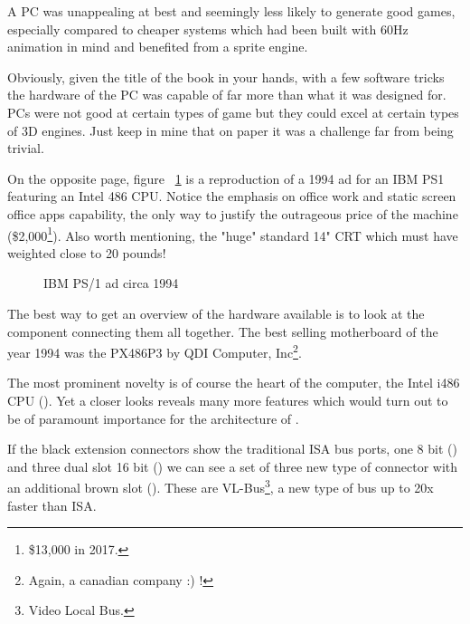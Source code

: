 \par
 A PC was unappealing at best and seemingly less likely to generate good games, especially compared to cheaper systems which had been built with 60Hz animation in mind and benefited from a sprite engine.\\
 \par
  Obviously, given the title of the book in your hands, with a few software tricks the hardware of the PC was capable of far more than what it was designed for. PCs were not good at certain types of game but they could excel at certain types of 3D engines. Just keep in mine that on paper it was a challenge far from being trivial.\\
\par

On the opposite page, figure ~\ref{ibm_ps1_top} is a reproduction of a 1994 ad for an IBM PS1 featuring an Intel 486 CPU. Notice the emphasis on office work and static screen office apps capability, the only way to justify the outrageous price of the machine (\$2,000\footnote{\$13,000 in 2017.}). Also worth mentioning, the "huge" standard 14" CRT which must have weighted close to 20 pounds!\\
\par
\begin{figure}[H] \centering
{}
\caption{IBM PS/1 ad circa 1994}
\label{ibm_ps1_top}
\end{figure}


















\cleartoleftpage
 
The best way to get an overview of the hardware available is to look at the component connecting them all together. The best selling motherboard of the year 1994 was the PX486P3 by QDI Computer, Inc\footnote{Again, a canadian company :) !}.\\

\par
The most prominent novelty is of course the heart of the computer, the Intel i486 CPU (). Yet a closer looks reveals many more features which would turn out to be of paramount importance for the architecture of \doom.\\
\par 
If the black extension connectors show the traditional ISA bus ports, one 8 bit () and three dual slot 16 bit () we can see a set of three new type of connector with an additional brown slot (). These are VL-Bus\footnote{Video Local Bus.}, a new type of bus up to 20x faster than ISA.

